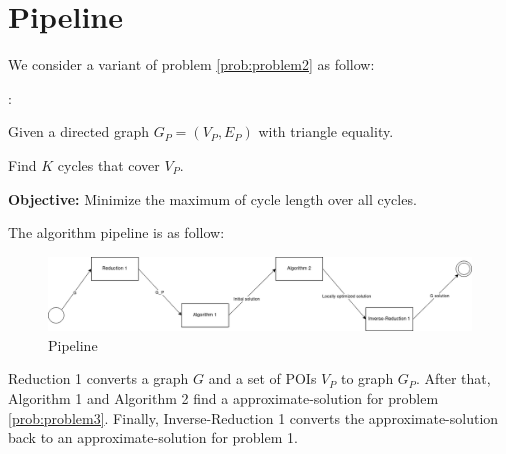 \chapter{Pipeline}

We consider a variant of problem \ref{prob:problem2} as follow:

\begin{problem}[Problem 3]:

Given a directed graph $G_P = (V_P, E_P)$ with triangle equality.

Find $K$ cycles that cover $V_P$.

\textbf{Objective:} Minimize the maximum of cycle length over all cycles.

\label{prob:problem3}
\end{problem}

The algorithm pipeline is as follow:

\begin{figure}[!h]
\centering
\includegraphics[width=1.2\textwidth]{assets/pipeline.png}
\caption{Pipeline}
\label{fig:pipeline}
\end{figure}

Reduction 1 converts a graph $G$ and a set of POIs $V_P$ to graph $G_P$. After that, Algorithm 1 and Algorithm 2 find a approximate-solution for problem \ref{prob:problem3}. Finally, Inverse-Reduction 1 converts the approximate-solution back to an approximate-solution for problem 1.
